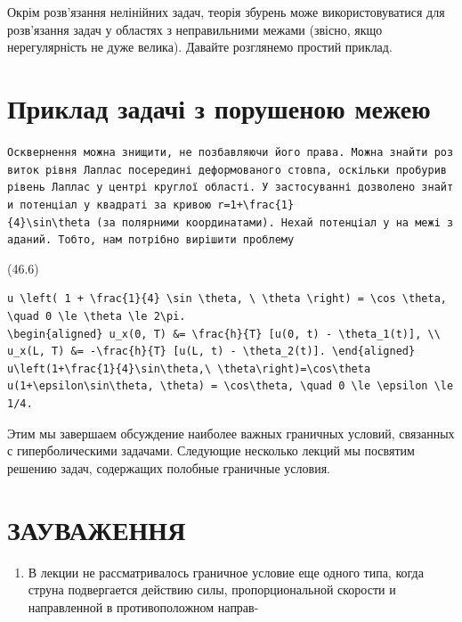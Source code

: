 \documentclass[
  ukrainian,
]{article}
\providecommand{\tightlist}{%
  \setlength{\itemsep}{0pt}\setlength{\parskip}{0pt}}
\begin{document}
Окрім розв'язання нелінійних задач, теорія збурень може
використовуватися для розв'язання задач у областях з неправильними
межами (звісно, якщо нерегулярність не дуже велика). Давайте розглянемо
простий приклад.

\section{Приклад задачі з порушеною
межею}\label{ux43fux440ux438ux43aux43bux430ux434-ux437ux430ux434ux430ux447ux456-ux437-ux43fux43eux440ux443ux448ux435ux43dux43eux44e-ux43cux435ux436ux435ux44e}

\texttt{Осквернення\ можна\ знищити,\ не\ позбавляючи\ його\ права.\ Можна\ знайти\ розвиток\ рівня\ Лаплас\ посередині\ деформованого\ стовпа,\ оскільки\ пробурив\ рівень\ Лаплас\ у\ центрі\ круглої\ області.\ У\ застосуванні\ дозволено\ знайти\ потенціал\ у\ квадраті\ за\ кривою\ \textquotesingle{}r=1+\textbackslash{}frac\{1\}\{4\}\textbackslash{}sin\textbackslash{}theta\textquotesingle{}\ (за\ полярними\ координатами).\ Нехай\ потенціал\ у\ на\ межі\ заданий.\ Тобто,\ нам\ потрібно\ вирішити\ проблему}

(46.6)

\begin{verbatim}
u \left( 1 + \frac{1}{4} \sin \theta, \ \theta \right) = \cos \theta, \quad 0 \le \theta \le 2\pi.
\begin{aligned} u_x(0, T) &= \frac{h}{T} [u(0, t) - \theta_1(t)], \\ u_x(L, T) &= -\frac{h}{T} [u(L, t) - \theta_2(t)]. \end{aligned}
u\left(1+\frac{1}{4}\sin\theta,\ \theta\right)=\cos\theta
u(1+\epsilon\sin\theta, \theta) = \cos\theta, \quad 0 \le \epsilon \le 1/4.
\end{verbatim}

Этим мы завершаем обсуждение наиболее важных граничных условий,
связанных с гиперболическими задачами. Следующие несколько лекций мы
посвятим решению задач, содержащих полобные граничные условия.

\section{ЗАУВАЖЕННЯ}\label{ux437ux430ux443ux432ux430ux436ux435ux43dux43dux44f-1}

\begin{enumerate}
\def\labelenumi{\arabic{enumi}.}
\tightlist
\item
  В лекции не рассматривалось граничное условие еще одного типа, когда
  струна подвергается действию силы, пропорциональной скорости и
  направленной в противоположном направ-
\end{enumerate}
\end{document}
